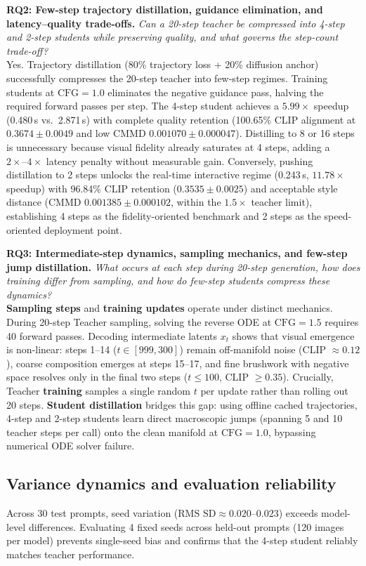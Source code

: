 \documentclass{article}
\begin{document}
\textbf{RQ2: Few-step trajectory distillation, guidance elimination, and latency--quality trade-offs.}
\textit{Can a 20-step teacher be compressed into 4-step and 2-step students while preserving quality, and what governs the step-count trade-off?} \\
Yes. Trajectory distillation (80\% trajectory loss + 20\% diffusion anchor) successfully compresses the 20-step teacher into few-step regimes. Training students at $\text{CFG}=1.0$ eliminates the negative guidance pass, halving the required forward passes per step. The 4-step student achieves a $5.99\times$ speedup (0.480\,s vs.\ 2.871\,s) with complete quality retention (100.65\% CLIP alignment at $0.3674 \pm 0.0049$ and low CMMD $0.001070 \pm 0.000047$). Distilling to 8 or 16 steps is unnecessary because visual fidelity already saturates at 4 steps, adding a $2\times\text{--}4\times$ latency penalty without measurable gain. Conversely, pushing distillation to 2 steps unlocks the real-time interactive regime (0.243\,s, $11.78\times$ speedup) with 96.84\% CLIP retention ($0.3535 \pm 0.0025$) and acceptable style distance (CMMD $0.001385 \pm 0.000102$, within the $1.5\times$ teacher limit), establishing 4 steps as the fidelity-oriented benchmark and 2 steps as the speed-oriented deployment point.

\textbf{RQ3: Intermediate-step dynamics, sampling mechanics, and few-step jump distillation.}
\textit{What occurs at each step during 20-step generation, how does training differ from sampling, and how do few-step students compress these dynamics?} \\
\textbf{Sampling steps} and \textbf{training updates} operate under distinct mechanics. During 20-step Teacher sampling, solving the reverse ODE at $\text{CFG}=1.5$ requires 40 forward passes. Decoding intermediate latents $x_t$ shows that visual emergence is non-linear: steps 1--14 ($t \in [999, 300]$) remain off-manifold noise (CLIP $\approx 0.12$), coarse composition emerges at steps 15--17, and fine brushwork with negative space resolves only in the final two steps ($t \le 100$, CLIP $\ge 0.35$). Crucially, Teacher \textbf{training} samples a single random $t$ per update rather than rolling out 20 steps. \textbf{Student distillation} bridges this gap: using offline cached trajectories, 4-step and 2-step students learn direct macroscopic jumps (spanning 5 and 10 teacher steps per call) onto the clean manifold at $\text{CFG}=1.0$, bypassing numerical ODE solver failure.

\subsection{Variance dynamics and evaluation reliability}
Across 30 test prompts, seed variation ($\text{RMS SD} \approx 0.020\text{--}0.023$) exceeds model-level differences. Evaluating 4 fixed seeds across held-out prompts (120 images per model) prevents single-seed bias and confirms that the 4-step student reliably matches teacher performance.
\end{document}
